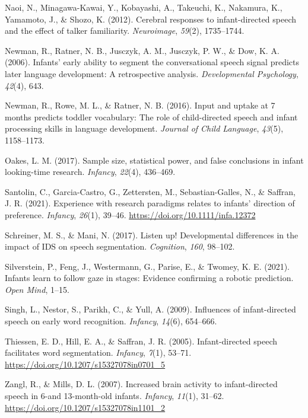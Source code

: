\documentclass[
  man,floatsintext]{apa6}
\newlength{\cslhangindent}
\newlength{\cslentryspacingunit} %
\newenvironment{CSLReferences}[2] %
 {%
  \setlength{\parindent}{0pt}
  \ifodd #1
  \let\oldpar\par
  \def\par{\hangindent=\cslhangindent\oldpar}
  \fi
  \setlength{\parskip}{#2\cslentryspacingunit}
 }%
 {}
\begin{document}
\begin{CSLReferences}{1}{0}
\leavevmode{}%
Naoi, N., Minagawa-Kawai, Y., Kobayashi, A., Takeuchi, K., Nakamura, K., Yamamoto, J., \& Shozo, K. (2012). Cerebral responses to infant-directed speech and the effect of talker familiarity. \emph{Neuroimage}, \emph{59}(2), 1735--1744.

\leavevmode{}%
Newman, R., Ratner, N. B., Jusczyk, A. M., Jusczyk, P. W., \& Dow, K. A. (2006). Infants' early ability to segment the conversational speech signal predicts later language development: A retrospective analysis. \emph{Developmental Psychology}, \emph{42}(4), 643.

\leavevmode{}%
Newman, R., Rowe, M. L., \& Ratner, N. B. (2016). Input and uptake at 7 months predicts toddler vocabulary: The role of child-directed speech and infant processing skills in language development. \emph{Journal of Child Language}, \emph{43}(5), 1158--1173.

\leavevmode{}%
Oakes, L. M. (2017). Sample size, statistical power, and false conclusions in infant looking-time research. \emph{Infancy}, \emph{22}(4), 436--469.

\leavevmode{}%
Santolin, C., Garcia-Castro, G., Zettersten, M., Sebastian-Galles, N., \& Saffran, J. R. (2021). Experience with research paradigms relates to infants' direction of preference. \emph{Infancy}, \emph{26}(1), 39--46. \url{https://doi.org/10.1111/infa.12372}

\leavevmode{}%
Schreiner, M. S., \& Mani, N. (2017). Listen up! Developmental differences in the impact of IDS on speech segmentation. \emph{Cognition}, \emph{160}, 98--102.

\leavevmode{}%
Silverstein, P., Feng, J., Westermann, G., Parise, E., \& Twomey, K. E. (2021). Infants learn to follow gaze in stages: Evidence confirming a robotic prediction. \emph{Open Mind}, 1--15.

\leavevmode{}%
Singh, L., Nestor, S., Parikh, C., \& Yull, A. (2009). Influences of infant-directed speech on early word recognition. \emph{Infancy}, \emph{14}(6), 654--666.

\leavevmode{}%
Thiessen, E. D., Hill, E. A., \& Saffran, J. R. (2005). Infant-directed speech facilitates word segmentation. \emph{Infancy}, \emph{7}(1), 53--71. \url{https://doi.org/10.1207/s15327078in0701_5}

\leavevmode{}%
Zangl, R., \& Mills, D. L. (2007). Increased brain activity to infant-directed speech in 6-and 13-month-old infants. \emph{Infancy}, \emph{11}(1), 31--62. \url{https://doi.org/10.1207/s15327078in1101_2}

\end{CSLReferences}

\endgroup
\end{document}
